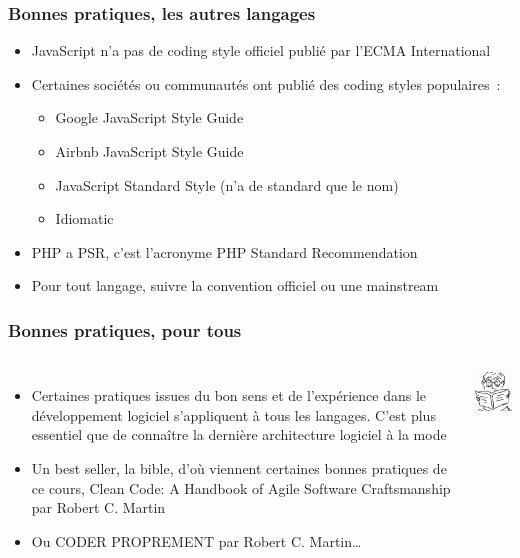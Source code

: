 \documentclass{beamer}
\begin{document}
    \begin{frame}
        \transdissolve
        \frametitle{Bonnes pratiques, les autres langages}

        \begin{itemize}

            \item JavaScript n'a pas de coding style officiel publié par l'ECMA International
            \item Certaines sociétés ou communautés ont publié des coding styles populaires~:

            \begin{itemize}
                \item Google JavaScript Style Guide
                \item Airbnb JavaScript Style Guide
                \item JavaScript Standard Style (n'a de standard que le nom)
                \item Idiomatic
            \end{itemize}
            \item PHP a PSR, c'est l'acronyme PHP Standard Recommendation
            \item Pour tout langage, suivre la convention officiel ou une mainstream

        \end{itemize}

    \end{frame}

    \begin{frame}
        \transdissolve
        \frametitle{Bonnes pratiques, pour tous}
        \begin{columns}
            \begin{itemize}

                \item Certaines pratiques issues du bon sens et de l'expérience dans le développement logiciel s'appliquent à tous les langages.
                C'est plus essentiel que de connaître la dernière architecture logiciel à la mode
                \item Un best seller, la bible, d'où viennent certaines bonnes pratiques de ce cours, Clean Code: A Handbook of Agile Software Craftsmanship par Robert C. Martin
                \item Ou CODER PROPREMENT par Robert C. Martin\ldots

            \end{itemize}
            \centering
            \includegraphics[width=3cm]{image/kid-reading.png}
        \end{columns}

    \end{frame}
\end{document}
